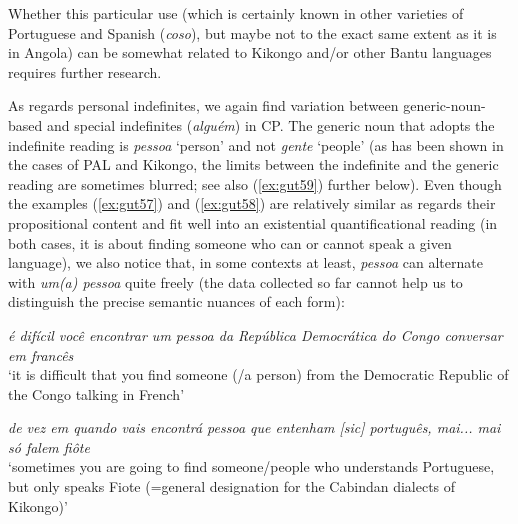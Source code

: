 \documentclass[output=paper,colorlinks,citecolor=brown]{langscibook}
\begin{document}
Whether this particular use (which is certainly known in other varieties of Portuguese and Spanish (\textit{coso}), but maybe not to the exact same extent as it is in Angola) can be somewhat related to Kikongo and/or other Bantu languages requires further research.

As regards personal indefinites, we again find variation between generic-noun-based and special indefinites (\textit{alguém}) in CP. The generic noun that adopts the indefinite reading is \textit{pessoa} ‘person’ and not \textit{gente} ‘people’ (as has been shown in the cases of PAL and Kikongo, the limits between the indefinite and the generic reading are sometimes blurred; see also (\ref{ex:gut59}) further below). Even though the examples (\ref{ex:gut57}) and (\ref{ex:gut58}) are relatively similar as regards their propositional content and fit well into an existential quantificational reading (in both cases, it is about finding someone who can or cannot speak a given language), we also notice that, in some contexts at least, \textit{pessoa} can alternate with \textit{um(a) pessoa} quite freely (the data collected so far cannot help us to distinguish the precise semantic nuances of each form):

\ea \label{ex:gut57}
    \textit{é difícil você encontrar um pessoa da República Democrática do Congo conversar em francês}\\
    ‘it is difficult that you find someone (/a person) from the Democratic Republic of the Congo talking in French’
    
    \ex \label{ex:gut58}
    \textit{de vez em quando vais encontrá pessoa que entenham [sic] português, mai... mai só falem fiôte}\\
    ‘sometimes you are going to find someone/people who understands Portuguese, but only speaks Fiote (=general designation for the Cabindan dialects of Kikongo)’
\z
\end{document}
